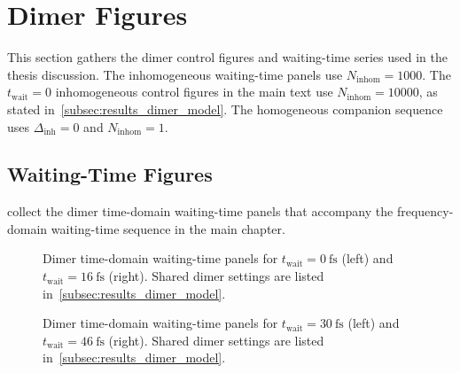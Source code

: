 \section{Dimer Figures}
\label{app:sec:paper_eqs_dimer}

This section gathers the dimer control figures and waiting-time series used in
the thesis discussion. The inhomogeneous waiting-time panels use
$N_{\mathrm{inhom}}=1000$. The \(t_{\mathrm{wait}}=0\) inhomogeneous control
figures in the main text use \(N_{\mathrm{inhom}}=10000\), as stated
in~\autoref{subsec:results_dimer_model}. The homogeneous companion sequence uses
\(\Delta_{\mathrm{inh}}=0\) and \(N_{\mathrm{inhom}}=1\).

\subsection{Waiting-Time Figures}

collect the dimer time-domain waiting-time panels that accompany the
frequency-domain waiting-time sequence in the main chapter.

\begin{figure}[htbp]
    \centering
    \begin{minipage}[t]{0.49\linewidth}
        \centering
        \safeplaceholdergraphic[1.22\linewidth]{\dimerFigFourWaitZeroPaperTimePath}
    \end{minipage}\hfill
    \begin{minipage}[t]{0.49\linewidth}
        \centering
        \safeplaceholdergraphic[1.22\linewidth]{\dimerFigFourWaitSixteenPaperTimePath}
    \end{minipage}
    \caption{Dimer time-domain waiting-time panels for
    \(t_{\mathrm{wait}}=\SI{0}{\femto\second}\) (left) and
    \(t_{\mathrm{wait}}=\SI{16}{\femto\second}\) (right). Shared dimer settings
    are listed in~\autoref{subsec:results_dimer_model}.}
    \label{fig:app_dimer_fig4_time_t0_t16}
\end{figure}

\begin{figure}[htbp]
    \centering
    \begin{minipage}[t]{0.49\linewidth}
        \centering
        \safeplaceholdergraphic[1.22\linewidth]{\dimerFigFourWaitThirtyPaperTimePath}
    \end{minipage}\hfill
    \begin{minipage}[t]{0.49\linewidth}
        \centering
        \safeplaceholdergraphic[1.22\linewidth]{\dimerFigFourWaitFortySixPaperTimePath}
    \end{minipage}
    \caption{Dimer time-domain waiting-time panels for
    \(t_{\mathrm{wait}}=\SI{30}{\femto\second}\) (left) and
    \(t_{\mathrm{wait}}=\SI{46}{\femto\second}\) (right). Shared dimer settings
    are listed in~\autoref{subsec:results_dimer_model}.}
    \label{fig:app_dimer_fig4_time_t30_t46}
\end{figure}

